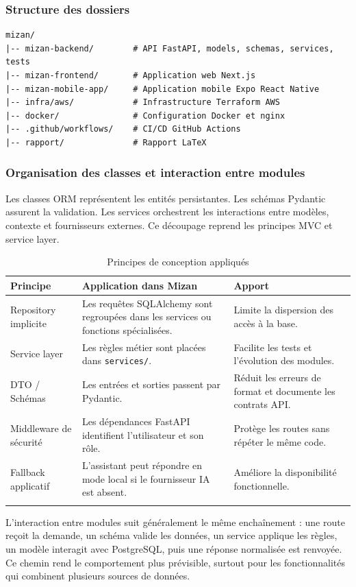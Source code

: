 \documentclass{rapportENSET}
\begin{document}
\subsubsection{Structure des dossiers}
\begin{lstlisting}
mizan/
|-- mizan-backend/        # API FastAPI, models, schemas, services, tests
|-- mizan-frontend/       # Application web Next.js
|-- mizan-mobile-app/     # Application mobile Expo React Native
|-- infra/aws/            # Infrastructure Terraform AWS
|-- docker/               # Configuration Docker et nginx
|-- .github/workflows/    # CI/CD GitHub Actions
|-- rapport/              # Rapport LaTeX
\end{lstlisting}

\subsubsection{Organisation des classes et interaction entre modules}
Les classes ORM représentent les entités persistantes. Les schémas Pydantic assurent la validation. Les services orchestrent les interactions entre modèles, contexte et fournisseurs externes. Ce découpage reprend les principes MVC et service layer.

\begin{longtable}{@{}L{0.25\textwidth}L{0.35\textwidth}L{0.30\textwidth}@{}}
\toprule
\textbf{Principe} & \textbf{Application dans Mizan} & \textbf{Apport} \\
\midrule
\endhead
Repository implicite & Les requêtes SQLAlchemy sont regroupées dans les services ou fonctions spécialisées. & Limite la dispersion des accès à la base. \\
Service layer & Les règles métier sont placées dans \texttt{services/}. & Facilite les tests et l'évolution des modules. \\
DTO / Schémas & Les entrées et sorties passent par Pydantic. & Réduit les erreurs de format et documente les contrats API. \\
Middleware de sécurité & Les dépendances FastAPI identifient l'utilisateur et son rôle. & Protège les routes sans répéter le même code. \\
Fallback applicatif & L'assistant peut répondre en mode local si le fournisseur IA est absent. & Améliore la disponibilité fonctionnelle. \\
\bottomrule
\caption{Principes de conception appliqués}
\end{longtable}

L'interaction entre modules suit généralement le même enchaînement : une route reçoit la demande, un schéma valide les données, un service applique les règles, un modèle interagit avec PostgreSQL, puis une réponse normalisée est renvoyée. Ce chemin rend le comportement plus prévisible, surtout pour les fonctionnalités qui combinent plusieurs sources de données.
\end{document}
